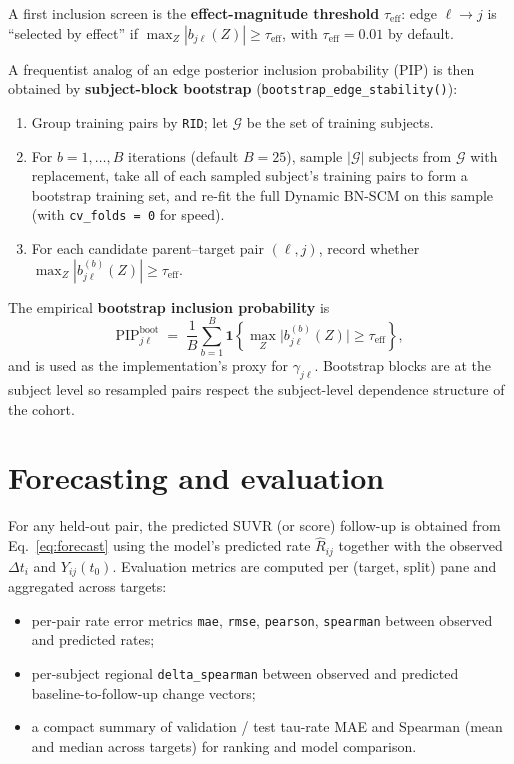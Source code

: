 \documentclass[11pt]{article}
\newcommand{\code}[1]{\texttt{#1}}
\begin{document}
A first inclusion screen is the \textbf{effect-magnitude threshold}
$\tau_{\text{eff}}$: edge $\ell \to j$ is ``selected by effect'' if
$\max_Z |b_{j\ell}(Z)| \geq \tau_{\text{eff}}$, with $\tau_{\text{eff}} = 0.01$
by default.

A frequentist analog of an edge posterior inclusion probability (PIP) is
then obtained by \textbf{subject-block bootstrap}
(\code{bootstrap\_edge\_stability()}):
\begin{enumerate}[leftmargin=*,nosep]
  \item Group training pairs by \code{RID}; let $\mathcal{G}$ be the set of training subjects.
  \item For $b = 1,\dots,B$ iterations (default $B = 25$), sample $|\mathcal{G}|$ subjects from $\mathcal{G}$ with replacement, take all of each sampled subject's training pairs to form a bootstrap training set, and re-fit the full Dynamic BN-SCM on this sample (with \code{cv\_folds = 0} for speed).
  \item For each candidate parent--target pair $(\ell, j)$, record whether $\max_Z |b_{j\ell}^{(b)}(Z)| \geq \tau_{\text{eff}}$.
\end{enumerate}
The empirical \textbf{bootstrap inclusion probability} is
\begin{equation}
\mathrm{PIP}^{\text{boot}}_{j\ell} \;=\; \frac{1}{B} \sum_{b=1}^{B} \mathbf{1}\!\left\{ \max_Z \bigl| b_{j\ell}^{(b)}(Z) \bigr| \geq \tau_{\text{eff}} \right\},
\label{eq:pip}
\end{equation}
and is used as the implementation's proxy for $\gamma_{j\ell}$. Bootstrap
blocks are at the subject level so resampled pairs respect the
subject-level dependence structure of the cohort.

\section{Forecasting and evaluation}

For any held-out pair, the predicted SUVR (or score) follow-up is obtained
from Eq.~\eqref{eq:forecast} using the model's predicted rate
$\hat{R}_{ij}$ together with the observed $\Delta t_i$ and $Y_{ij}(t_0)$.
Evaluation metrics are computed per (target, split) pane and aggregated
across targets:
\begin{itemize}[leftmargin=*,nosep]
  \item per-pair rate error metrics \code{mae}, \code{rmse}, \code{pearson}, \code{spearman} between observed and predicted rates;
  \item per-subject regional \code{delta\_spearman} between observed and predicted baseline-to-follow-up change vectors;
  \item a compact summary of validation / test tau-rate MAE and Spearman (mean and median across targets) for ranking and model comparison.
\end{itemize}
\end{document}
